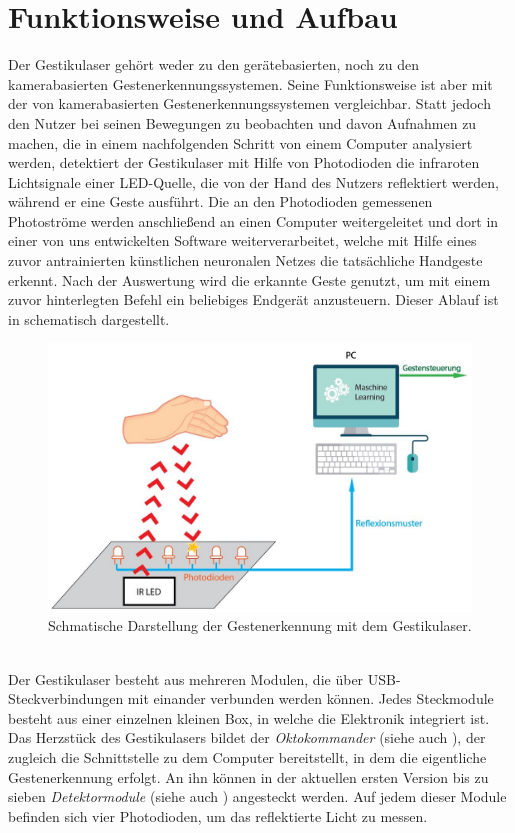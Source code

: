\chapter{Funktionsweise und Aufbau}
\label{ch:Aufbau}

Der Gestikulaser gehört weder zu den gerätebasierten, noch zu den kamerabasierten Gestenerkennungssystemen. Seine Funktionsweise ist aber mit der von kamerabasierten Gestenerkennungssystemen vergleichbar. Statt jedoch den Nutzer bei seinen Bewegungen zu beobachten und davon Aufnahmen zu machen, die in einem nachfolgenden Schritt von einem Computer analysiert werden, detektiert der Gestikulaser mit Hilfe von Photodioden die infraroten Lichtsignale einer LED-Quelle, die von der Hand des Nutzers reflektiert werden, während er eine Geste ausführt. Die an den Photodioden gemessenen Photoströme werden anschließend an einen Computer weitergeleitet und dort in einer von uns entwickelten Software weiterverarbeitet, welche mit Hilfe eines zuvor antrainierten künstlichen neuronalen Netzes die tatsächliche Handgeste erkennt. Nach der Auswertung wird die erkannte Geste genutzt, um mit einem zuvor hinterlegten Befehl ein beliebiges Endgerät anzusteuern. Dieser Ablauf ist in  schematisch dargestellt.
\begin{figure}[h]
	\centering
	\includegraphics[width=15cm]{../figures/AblaufGestikulaser2.jpg}
	\caption{Schmatische Darstellung der Gestenerkennung mit dem Gestikulaser.}
	\label{fig:AblaufGestikulaser}
\end{figure} \\
Der Gestikulaser besteht aus mehreren Modulen, die über USB-Steckverbindungen mit einander verbunden werden können. Jedes Steckmodule besteht aus einer einzelnen kleinen Box, in welche die Elektronik integriert ist. Das Herzstück des Gestikulasers bildet der \textit{Oktokommander} (siehe auch ), der zugleich die Schnittstelle zu dem Computer bereitstellt, in dem die eigentliche Gestenerkennung erfolgt. An ihn können in der aktuellen ersten Version bis zu sieben \textit{Detektormodule} (siehe auch ) angesteckt werden. Auf jedem dieser Module befinden sich vier Photodioden, um das reflektierte Licht zu messen. 
